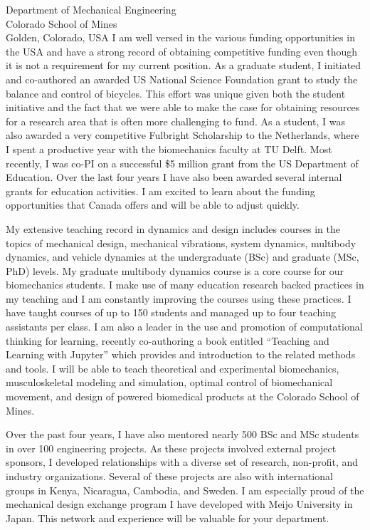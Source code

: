 \documentclass{letter}
\begin{document}
\begin{letter}{
    Department of Mechanical Engineering \\
    Colorado School of Mines \\
    Golden, Colorado, USA
}
I am well versed in the various funding opportunities in the USA and have a
strong record of obtaining competitive funding even though it is not a
requirement for my current position. As a graduate student, I initiated and
co-authored an awarded US National Science Foundation grant to study the
balance and control of bicycles. This effort was unique given both the student
initiative and the fact that we were able to make the case for obtaining
resources for a research area that is often more challenging to fund. As a
student, I was also awarded a very competitive Fulbright Scholarship to the
Netherlands, where I spent a productive year with the biomechanics faculty at
TU Delft. Most recently, I was co-PI on a successful \$5 million grant from the
US Department of Education. Over the last four years I have also been awarded
several internal grants for education activities. I am excited to learn about
the funding opportunities that Canada offers and will be able to adjust
quickly.

My extensive teaching record in dynamics and design includes courses in the
topics of mechanical design, mechanical vibrations, system dynamics, multibody
dynamics, and vehicle dynamics at the undergraduate (BSc) and graduate (MSc,
PhD) levels. My graduate multibody dynamics course is a core course for our
biomechanics students. I make use of many education research backed practices
in my teaching and I am constantly improving the courses using these practices.
I have taught courses of up to 150 students and managed up to four teaching
assistants per class. I am also a leader in the use and promotion of
computational thinking for learning, recently co-authoring a book entitled
``Teaching and Learning with Jupyter'' which provides and introduction to the
related methods and tools. I will be able to teach theoretical and experimental
biomechanics, musculoskeletal modeling and simulation, optimal control of
biomechanical movement, and design of powered biomedical products at the
Colorado School of Mines.

Over the past four years, I have also mentored nearly 500 BSc and MSc students
in over 100 engineering projects. As these projects involved external project
sponsors, I developed relationships with a diverse set of research, non-profit,
and industry organizations. Several of these projects are also with
international groups in Kenya, Nicaragua, Cambodia, and Sweden. I am especially
proud of the mechanical design exchange program I have developed with Meijo
University in Japan. This network and experience will be valuable for your
department.


\end{letter}
\end{document}

